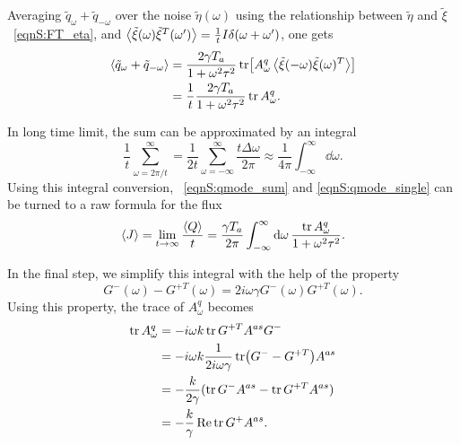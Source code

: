 \documentclass[
 amsmath,amssymb,
 aps,
 pre,
 longbibliography,
 10pt, onecolumn,
 notitlepage
]{revtex4-1}
\begin{document}
Averaging $\tilde{q}_\omega + \tilde{q}_{-\omega}$ over the noise $\tilde{\eta}(\omega)$ using the relationship between $\tilde{\eta}$ and $\tilde{\xi}$ \eqnname~\eqref{eqnS:FT_eta}, and $\expval{\tilde{\xi}(\omega) \tilde{\xi}^T(\omega')} = \frac{1}{t} I \delta(\omega + \omega')$, one gets
\begin{equation} \label{eqnS:qmode_single}
\begin{split}
\expval{\tilde{q}_\omega + \tilde{q}_{-\omega}}
&= \frac{2\gamma T_a}{1 + \omega^2 \tau^2} \tr[A_\omega^q \expval{\tilde{\xi}(-\omega)\tilde{\xi}(\omega)^T}] \\
&= \frac{1}{t} \frac{2\gamma T_a}{1 + \omega^2 \tau^2} \tr A_\omega^q .
\end{split}
\end{equation}

In long time limit, the sum can be approximated by an integral
\begin{equation}
\frac{1}{t} \sum_{\omega=2\pi/t}^{\infty}
= \frac{1}{2t} \sum_{\omega=-\infty}^{\infty} \frac{t \Delta\omega}{2\pi}
\approx \frac{1}{4\pi}\int_{-\infty}^{\infty} \dd{\omega} .
\end{equation}
Using this integral conversion, \eqnname~\eqref{eqnS:qmode_sum} and \eqref{eqnS:qmode_single} can be turned to a raw formula for the flux
\begin{equation} \label{eqnS:flux_integral_raw}
\expval{J} = \lim_{t\rightarrow \infty} \frac{\expval{Q}}{t}
= \frac{\gamma T_a}{2\pi} \int_{-\infty}^{\infty} \dd{\omega} \frac{\tr A_\omega^q}{1+\omega^2\tau^2} .
\end{equation}

In the final step, we simplify this integral with the help of the property \cite{Kundu2011LargeDeviations}
\begin{equation} \label{eqnS:response_property}
G^-(\omega) - G^{+T}(\omega) = 2i\omega\gamma G^-(\omega)G^{+T}(\omega) .
\end{equation}
Using this property, the trace of $A_\omega^q$ becomes
\begin{equation}
\begin{split}
\tr A_\omega^q &= -i\omega k \tr G^{+T} A^{as} G^- \\
&= -i\omega k \frac{1}{2i\omega \gamma} \tr (G^- - G^{+T})A^{as} \\
&= -\frac{k}{2\gamma} (\tr G^-A^{as} - \tr G^{+T}A^{as}) \\
&= -\frac{k}{\gamma} \Re\tr G^+A^{as} .
\end{split}
\end{equation}
\end{document}
